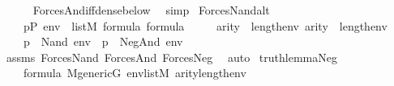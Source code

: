 \begin{isabellebody}
\ \ \ \ \isamarkupfalse%
\ Forces{\isacharunderscore}{\kern0pt}And{\isacharunderscore}{\kern0pt}iff{\isacharunderscore}{\kern0pt}dense{\isacharunderscore}{\kern0pt}below\ \isamarkupfalse%
\ simp\isanewline
{}\isamarkupfalse%
%
\endisatagproof
{\isafoldproof}%
%
\isadelimproof
\isanewline
%
\endisadelimproof
\isanewline
{}\isamarkupfalse%
\ Forces{\isacharunderscore}{\kern0pt}Nand{\isacharunderscore}{\kern0pt}alt{\isacharcolon}{\kern0pt}\isanewline
\ \ \isanewline
\ \ \ \ {\isachardoublequoteopen}p{\isasymin}P{\isachardoublequoteclose}\ {\isachardoublequoteopen}env\ {\isasymin}\ list{\isacharparenleft}{\kern0pt}M{\isacharparenright}{\kern0pt}{\isachardoublequoteclose}\ {\isachardoublequoteopen}{\isasymphi}{\isasymin}formula{\isachardoublequoteclose}\ {\isachardoublequoteopen}{\isasympsi}{\isasymin}formula{\isachardoublequoteclose}\ \isanewline
\ \ \ \ {\isachardoublequoteopen}arity{\isacharparenleft}{\kern0pt}{\isasymphi}{\isacharparenright}{\kern0pt}\ {\isasymle}\ length{\isacharparenleft}{\kern0pt}env{\isacharparenright}{\kern0pt}{\isachardoublequoteclose}\ {\isachardoublequoteopen}arity{\isacharparenleft}{\kern0pt}{\isasympsi}{\isacharparenright}{\kern0pt}\ {\isasymle}\ length{\isacharparenleft}{\kern0pt}env{\isacharparenright}{\kern0pt}{\isachardoublequoteclose}\isanewline
\ \ \isanewline
\ \ \ \ {\isachardoublequoteopen}{\isacharparenleft}{\kern0pt}p\ {\isasymtturnstile}\ Nand{\isacharparenleft}{\kern0pt}{\isasymphi}{\isacharcomma}{\kern0pt}{\isasympsi}{\isacharparenright}{\kern0pt}\ env{\isacharparenright}{\kern0pt}\ {\isasymlongleftrightarrow}\ {\isacharparenleft}{\kern0pt}p\ {\isasymtturnstile}\ Neg{\isacharparenleft}{\kern0pt}And{\isacharparenleft}{\kern0pt}{\isasymphi}{\isacharcomma}{\kern0pt}{\isasympsi}{\isacharparenright}{\kern0pt}{\isacharparenright}{\kern0pt}\ env{\isacharparenright}{\kern0pt}{\isachardoublequoteclose}\isanewline
%
\isadelimproof
\ \ %
\endisadelimproof
%
\isatagproof
{}\isamarkupfalse%
\ assms\ Forces{\isacharunderscore}{\kern0pt}Nand\ Forces{\isacharunderscore}{\kern0pt}And\ Forces{\isacharunderscore}{\kern0pt}Neg\ \isamarkupfalse%
\ auto%
\endisatagproof
{\isafoldproof}%
%
\isadelimproof
\isanewline
%
\endisadelimproof
\isanewline
{}\isamarkupfalse%
\ truth{\isacharunderscore}{\kern0pt}lemma{\isacharunderscore}{\kern0pt}Neg{\isacharcolon}{\kern0pt}\isanewline
\ \ \ \isanewline
\ \ \ \ {\isachardoublequoteopen}{\isasymphi}{\isasymin}formula{\isachardoublequoteclose}\ {\isachardoublequoteopen}M{\isacharunderscore}{\kern0pt}generic{\isacharparenleft}{\kern0pt}G{\isacharparenright}{\kern0pt}{\isachardoublequoteclose}\ {\isachardoublequoteopen}env{\isasymin}list{\isacharparenleft}{\kern0pt}M{\isacharparenright}{\kern0pt}{\isachardoublequoteclose}\ {\isachardoublequoteopen}arity{\isacharparenleft}{\kern0pt}{\isasymphi}{\isacharparenright}{\kern0pt}{\isasymle}length{\isacharparenleft}{\kern0pt}env{\isacharparenright}{\kern0pt}{\isachardoublequoteclose}\ \isanewline

\end{isabellebody}
